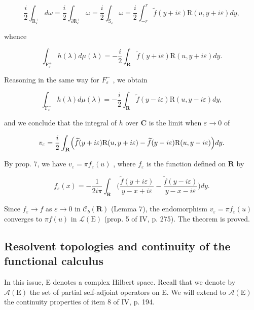 \[
\frac {i}{2} \int_ {\mathrm{R} _ {\varepsilon} ^ {+}} d \omega = \frac {i}{2} \int_ {\partial \mathrm{R} _ {\varepsilon} ^ {+}} \omega = \frac {i}{2} \int_ {\mathrm{S} _ {\varepsilon}} \omega = \frac {i}{2} \int_ {- r} ^ {r} \widetilde {f} (y + i \varepsilon) \mathrm{R} (u, y + i \varepsilon) d y,
\]

whence

\[
\int_ {\mathrm{F} _ {\varepsilon} ^ {+}} h (\lambda) d \mu (\lambda) = - \frac {i}{2} \int_ {\mathbf {R}} \widetilde {f} (y + i \varepsilon) \mathrm{R} (u, y + i \varepsilon) d y.
\]

Reasoning in the same way for \(F_{\varepsilon}^{-}\) , we obtain

\[
\int_ {\mathrm{F} _ {\varepsilon} ^ {-}} h (\lambda) d \mu (\lambda) = - \frac {i}{2} \int_ {\mathbf {R}} \widetilde {f} (y - i \varepsilon) \mathrm{R} (u, y - i \varepsilon) d y,
\]

and we conclude that the integral of \(h\) over \(\mathbf{C}\) is the limit when \(\varepsilon\to0\) of

\[
v _ {\varepsilon} = \frac {i}{2} \int_ {\mathbf {R}} \Bigl (\widetilde {f} (y + i \varepsilon) \mathrm{R} (u, y + i \varepsilon) - \widetilde {f} (y - i \varepsilon) \mathrm{R} (u, y - i \varepsilon) \Bigr) d y.
\]

By prop. 7, we have \(v_{\varepsilon} = \pi f_{\varepsilon}(u)\) , where \(f_{\varepsilon}\) is the function defined on \(\mathbf{R}\) by

\[
f _ {\varepsilon} (x) = - \frac {1}{2 i \pi} \int_ {\mathbf {R}} \biggl (\frac {\widetilde {f} (y + i \varepsilon)}{y - x + i \varepsilon} - \frac {\widetilde {f} (y - i \varepsilon)}{y - x - i \varepsilon} \biggr) d y.
\]

Since \(f_{\varepsilon} \to f\) as \(\varepsilon \to 0\) in \(\mathcal{C}_{b}(\mathbf{R})\) (Lemma 7), the endomorphism \(v_{\varepsilon} = \pi f_{\varepsilon}(u)\) converges to \(\pi f(u)\) in \(\mathcal{L}(\mathrm{E})\) (prop. 5 of IV, p. 275). The theorem is proved.

\subsection{Resolvent topologies and continuity of the functional calculus}

In this issue, E denotes a complex Hilbert space. Recall that we denote by \(\mathcal{A}(\mathrm{E})\) the set of partial self-adjoint operators on E. We will extend to \(\mathcal{A}(\mathrm{E})\) the continuity properties of item 8 of IV, p. 194.

